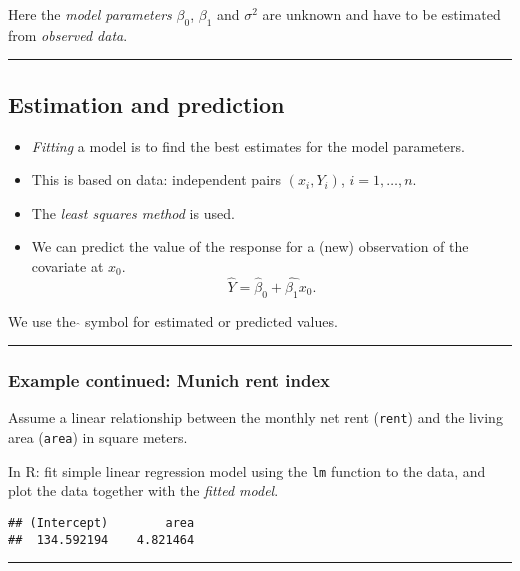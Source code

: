 \documentclass[]{article}
\providecommand{\tightlist}{%
  \setlength{\itemsep}{0pt}\setlength{\parskip}{0pt}}
\begin{document}
Here the \emph{model parameters} \(\beta_0\), \(\beta_1\) and
\(\sigma^2\) are unknown and have to be estimated from \emph{observed
data}.

\begin{center}\rule{0.5\linewidth}{\linethickness}\end{center}

\hypertarget{estimation-and-prediction}{%
\subsection{Estimation and prediction}\label{estimation-and-prediction}}

\begin{itemize}
\tightlist
\item
  \emph{Fitting} a model is to find the best estimates for the model
  parameters.
\item
  This is based on data: independent pairs \((x_i,Y_i)\),
  \(i=1,\ldots,n\).
\item
  The \emph{least squares method} is used.
\item
  We can predict the value of the response for a (new) observation of
  the covariate at \(x_0\).
  \[\hat{Y} = \hat{\beta}_0 + \hat{\beta_1}x_0.\]
\end{itemize}

We use the \(\hat{}\) symbol for estimated or predicted values.

\begin{center}\rule{0.5\linewidth}{\linethickness}\end{center}

\hypertarget{example-continued-munich-rent-index}{%
\subsubsection{Example continued: Munich rent
index}\label{example-continued-munich-rent-index}}

Assume a linear relationship between the monthly net rent
(\texttt{rent}) and the living area (\texttt{area}) in square meters.

In R: fit simple linear regression model using the \texttt{lm} function
to the data, and plot the data together with the \emph{fitted model}.

\begin{verbatim}
## (Intercept)        area 
##  134.592194    4.821464
\end{verbatim}

\begin{center}\rule{0.5\linewidth}{\linethickness}\end{center}
\end{document}
